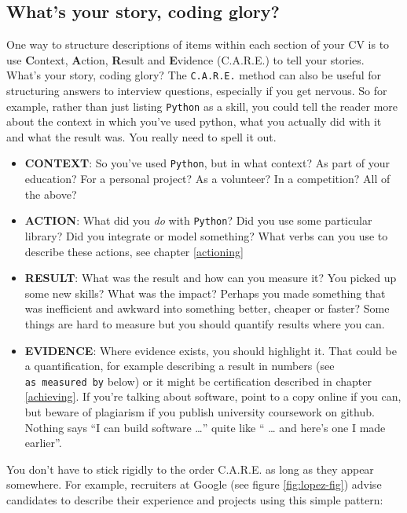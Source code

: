 \documentclass[
]{book}
\providecommand{\tightlist}{%
  \setlength{\itemsep}{0pt}\setlength{\parskip}{0pt}}
\begin{document}
\hypertarget{care}{%
\subsection{What's your story, coding glory?}\label{care}}

One way to structure descriptions of items within each section of your CV is to use \textbf{C}ontext, \textbf{A}ction, \textbf{R}esult and \textbf{E}vidence (C.A.R.E.) to tell your stories. What's your story, coding glory? \citep{whatsthestory} The \texttt{C.A.R.E.} method can also be useful for structuring answers to interview questions, especially if you get nervous. So for example, rather than just listing \texttt{Python} as a skill, you could tell the reader more about the context in which you've used python, what you actually did with it and what the result was. You really need to spell it out.

\begin{itemize}
\tightlist
\item
  \textbf{CONTEXT}: So you've used \texttt{Python}, but in what context? As part of your education? For a personal project? As a volunteer? In a competition? All of the above?
\item
  \textbf{ACTION}: What did you \emph{do} with \texttt{Python}? Did you use some particular library? Did you integrate or model something? What verbs can you use to describe these actions, see chapter \ref{actioning}
\item
  \textbf{RESULT}: What was the result and how can you measure it? You picked up some new skills? What was the impact? Perhaps you made something that was inefficient and awkward into something better, cheaper or faster? Some things are hard to measure but you should quantify results where you can.
\item
  \textbf{EVIDENCE}: Where evidence exists, you should highlight it. That could be a quantification, for example describing a result in numbers (see \texttt{as\ measured\ by} below) or it might be certification described in chapter \ref{achieving}. If you're talking about software, point to a copy online if you can, but beware of plagiarism if you publish university coursework on github. Nothing says ``I can build software \ldots{}'' quite like `` \ldots{} and here's one I made earlier''.
\end{itemize}

You don't have to stick rigidly to the order C.A.R.E. as long as they appear somewhere. For example, recruiters at Google (see figure \ref{fig:lopez-fig}) advise candidates to describe their experience and projects using this simple pattern:
\end{document}
